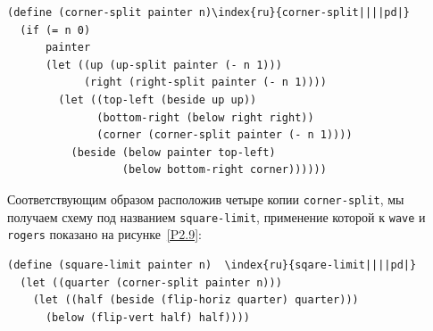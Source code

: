 \begin{Verbatim}[fontsize=\small]
(define (corner-split painter n)\index{ru}{corner-split||||pd|}
  (if (= n 0)
      painter
      (let ((up (up-split painter (- n 1)))
            (right (right-split painter (- n 1))))
        (let ((top-left (beside up up))
              (bottom-right (below right right))
              (corner (corner-split painter (- n 1))))
          (beside (below painter top-left)
                  (below bottom-right corner))))))
\end{Verbatim}
Соответствующим образом расположив четыре копии
{\tt corner-split}, мы получаем схему под названием
{\tt square-limit}, применение которой к {\tt wave} и
{\tt rogers} показано на рисунке~\ref{P2.9}:

\begin{Verbatim}[fontsize=\small]
(define (square-limit painter n)  \index{ru}{sqare-limit||||pd|}
  (let ((quarter (corner-split painter n)))
    (let ((half (beside (flip-horiz quarter) quarter)))
      (below (flip-vert half) half))))
\end{Verbatim}


